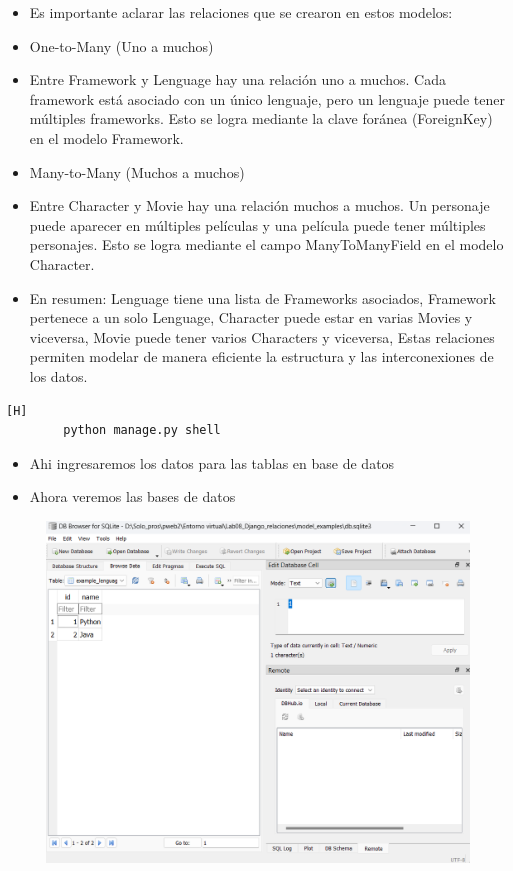 \documentclass{article}
\begin{document}
	\begin{itemize}
		\item Es importante aclarar las relaciones que se crearon en estos modelos:
		\item One-to-Many (Uno a muchos)
		\item Entre Framework y Lenguage hay una relación uno a muchos. Cada framework está asociado con un único lenguaje, pero un lenguaje puede tener múltiples frameworks. Esto se logra mediante la clave foránea (ForeignKey) en el modelo Framework.
		\item Many-to-Many (Muchos a muchos)
		\item Entre Character y Movie hay una relación muchos a muchos. Un personaje puede aparecer en múltiples películas y una película puede tener múltiples personajes. Esto se logra mediante el campo ManyToManyField en el modelo Character.
		\item En resumen: Lenguage tiene una lista de Frameworks asociados, Framework pertenece a un solo Lenguage, Character puede estar en varias Movies y viceversa, Movie puede tener varios Characters y viceversa, Estas relaciones permiten modelar de manera eficiente la estructura y las interconexiones de los datos.
	\end{itemize}
	\begin{lstlisting}[language=bash,caption={Ingresamos a shell de python}][H]
		python manage.py shell
	\end{lstlisting}
	\begin{itemize}
		\item Ahi ingresaremos los datos para las tablas en base de datos
		\item Ahora veremos las bases de datos
	\end{itemize}
	\begin{figure}[H]
		\centering
		\includegraphics[width=1.0\textwidth,keepaspectratio]{img/C1.png}
	\end{figure}
\end{document}
